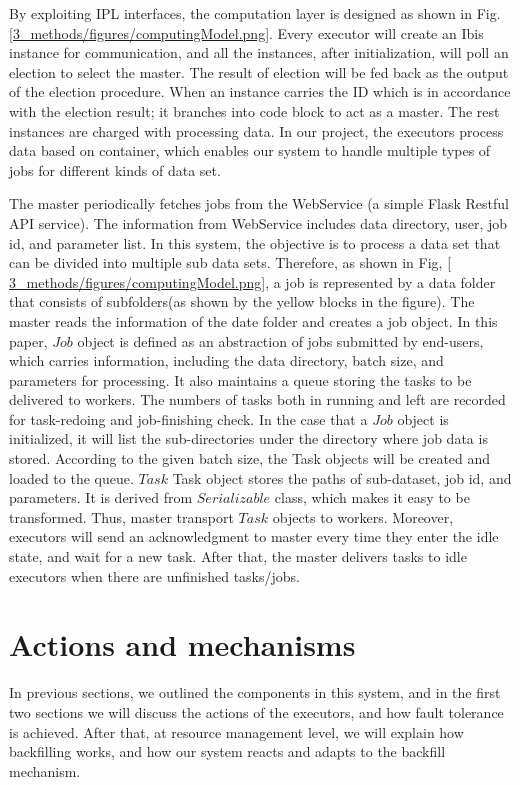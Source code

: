 By exploiting IPL interfaces, the computation layer is designed as shown in Fig. \ref{3_methods/figures/computingModel.png}. 
Every executor will create an Ibis instance for communication, and all the instances, after initialization, will poll an election to select the master. 
The result of election will be fed back as the output of the election procedure. 
When an instance carries the ID which is in accordance with the election result; 
it branches into code block to act as a master. 
The rest instances are charged with processing data. 
In our project, the executors process data based on container, which enables our system to handle multiple types of jobs for different kinds of data set.


The master periodically fetches jobs from the WebService (a simple Flask Restful API service). 
The information from WebService includes data directory, user, job id, and parameter list. 
In this system, the objective is to process a data set that can be divided into multiple sub data sets. 
Therefore, as shown in Fig, \ref{ 3_methods/figures/computingModel.png}, a job is represented by a data folder that consists of subfolders(as shown by the yellow blocks in the figure).
The master reads the information of the date folder and creates a job object. 
In this paper, $Job$ object is defined as an abstraction of jobs submitted by end-users, which carries information, including the data directory, batch size, and parameters for processing. 
It also maintains a queue storing the tasks to be delivered to workers. The numbers of tasks both in running and left are recorded for task-redoing and job-finishing check. 
In the case that a $Job$ object is initialized, it will list the sub-directories under the directory where job data is stored.
According to the given batch size, the Task objects will be created and loaded to the queue. 
$Task$ Task object stores the paths of sub-dataset, job id, and parameters. 
It is derived from $Serializable$ class, which makes it easy to be transformed. 
Thus, master transport $Task$ objects to workers.
Moreover, executors will send an acknowledgment to master every time they enter the idle state, and wait for a new task. 
After that, the master delivers tasks to idle executors when there are unfinished tasks/jobs.

\section{Actions and mechanisms}
In previous sections, we outlined the components in this system, and in the first two sections we will discuss the actions of the executors, and how fault tolerance is achieved. 
After that, at resource management level, we will explain how backfilling works, and how our system reacts and adapts to the backfill mechanism.

